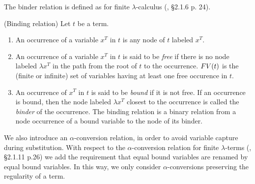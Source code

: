 
The binder relation is defined as for finite $\lambda$-calculus 
(\cite{Barendregt1984-BARTLC}, \S 2.1.6 p. 24). 

\begin{definition}(Binding relation)
\label{definition-binder-relation}
Let $t$ be a term.
\begin{enumerate}
\item
An occurrence of a variable $x^T$ in $t$ is any node of $t$ labeled $x^T$.
\item
An occurrence of a variable $x^T$ in $t$ is said to be \emph{free} if there is no node labeled $\lambda x^T$
in the path from the root of $t$ to the occurrence. 
${{\relax FV}}(t)$ is the (finite or infinite) set of variables having at least one free occurence in $t$.
\item
An occurrence of $x^T$ in $t$ is said to be \emph{bound} if it is not free. If an occurrence is bound, then
the node labeled $\lambda x^T$ closest to the occurrence is called the \emph{binder} of
the occurrence.
The binding relation is a binary relation from a node occurrence of a bound variable to the node of its binder. 
\end{enumerate}
\end{definition}

We also introduce an $\alpha$-conversion relation, in order to avoid variable capture
during substitution. With respect to the $\alpha$-conversion
relation for finite $\lambda$-terms (\cite{Barendregt1984-BARTLC}, \S 2.1.11 p.26) 
we add the requirement that equal bound variables are renamed by equal bound variables. 
In this way, we only consider $\alpha$-conversions 
preserving the regularity of a term.


